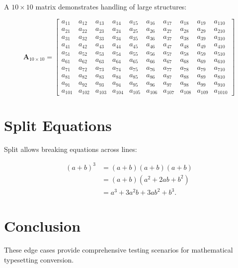 \documentclass{article}
\begin{document}
A $10 \times 10$ matrix demonstrates handling of large structures:

\[
\mathbf{A}_{10\times 10} =
\begin{bmatrix}
a_{11} & a_{12} & a_{13} & a_{14} & a_{15} & a_{16} & a_{17} & a_{18} & a_{19} & a_{110} \\
a_{21} & a_{22} & a_{23} & a_{24} & a_{25} & a_{26} & a_{27} & a_{28} & a_{29} & a_{210} \\
a_{31} & a_{32} & a_{33} & a_{34} & a_{35} & a_{36} & a_{37} & a_{38} & a_{39} & a_{310} \\
a_{41} & a_{42} & a_{43} & a_{44} & a_{45} & a_{46} & a_{47} & a_{48} & a_{49} & a_{410} \\
a_{51} & a_{52} & a_{53} & a_{54} & a_{55} & a_{56} & a_{57} & a_{58} & a_{59} & a_{510} \\
a_{61} & a_{62} & a_{63} & a_{64} & a_{65} & a_{66} & a_{67} & a_{68} & a_{69} & a_{610} \\
a_{71} & a_{72} & a_{73} & a_{74} & a_{75} & a_{76} & a_{77} & a_{78} & a_{79} & a_{710} \\
a_{81} & a_{82} & a_{83} & a_{84} & a_{85} & a_{86} & a_{87} & a_{88} & a_{89} & a_{810} \\
a_{91} & a_{92} & a_{93} & a_{94} & a_{95} & a_{96} & a_{97} & a_{98} & a_{99} & a_{910} \\
a_{101} & a_{102} & a_{103} & a_{104} & a_{105} & a_{106} & a_{107} & a_{108} & a_{109} & a_{1010}
\end{bmatrix}
\] \label{eq:large_matrix}

\section{Split Equations}

Split allows breaking equations across lines:

\begin{equation}
\begin{split}
(a+b)^3 &= (a+b)(a+b)(a+b) \\
        &= (a+b)(a^2 + 2ab + b^2) \\
        &= a^3 + 3a^2b + 3ab^2 + b^3 .
\end{split} \label{eq:split}
\end{equation}

\section{Conclusion}

These edge cases provide comprehensive testing scenarios for mathematical
typesetting conversion.



\end{document}
